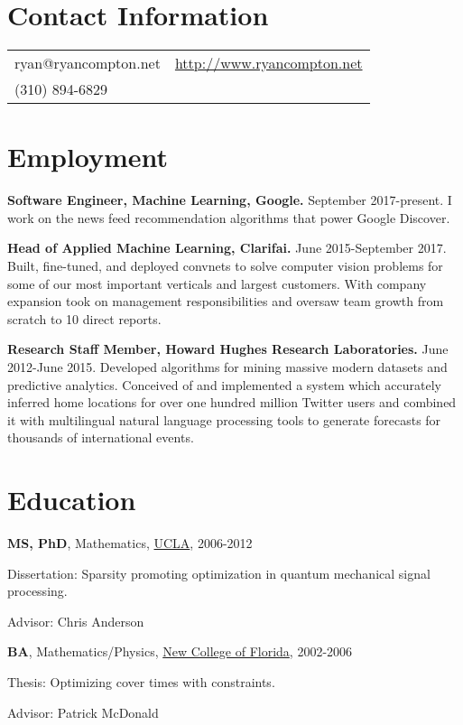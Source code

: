 \documentclass[margin,line]{res}
\newenvironment{list1}{
  \begin{list}{\ding{113}}{%
      \setlength{\itemsep}{0.0in}
      \setlength{\parsep}{0in} \setlength{\parskip}{0in}
      \setlength{\topsep}{0in} \setlength{\partopsep}{0in}
      \setlength{\leftmargin}{0.17in}}}{\end{list}}
\begin{document}

\begin{resume}
\section{\sc Contact Information}
\vspace{.05in}
\begin{tabular}{@{}p{2in}p{4in}}
    ryan@ryancompton.net   &  \url{http://www.ryancompton.net} \\
(310) 894-6829 & \\
\end{tabular}

\section{\sc Employment}

    {\bf Software Engineer, Machine Learning, Google.} September 2017-present. I work on the news feed recommendation algorithms that power Google Discover.
    
    {\bf Head of Applied Machine Learning, Clarifai.} June 2015-September 2017. Built, fine-tuned, and deployed convnets to solve computer vision problems for some of our most important verticals and largest customers. With company expansion took on management responsibilities and oversaw
team growth from scratch to 10 direct reports.

    {\bf Research Staff Member, Howard Hughes Research Laboratories.} June 2012-June 2015. Developed algorithms for mining massive modern datasets and predictive analytics. Conceived of and implemented a system which accurately inferred home locations for over one hundred million Twitter users and combined it with multilingual natural language processing tools to generate forecasts for thousands of international events.

\section{\sc Education}
    {\bf MS, PhD}, Mathematics, \href{https://ww3.math.ucla.edu/}{UCLA}, 2006-2012\\
\vspace*{-.1in}
\begin{list1}
\item [] Dissertation: Sparsity promoting optimization in quantum mechanical signal processing.
\item [] Advisor: Chris Anderson
\end{list1}
    {\bf BA}, Mathematics/Physics, \href{https://en.wikipedia.org/wiki/New_College_of_Florida}{New College of Florida}, 2002-2006\\
\vspace*{-.1in}
\begin{list1}
\item [] Thesis: Optimizing cover times with constraints.
\item [] Advisor: Patrick McDonald
\end{list1}


\end{resume}
\end{document}
